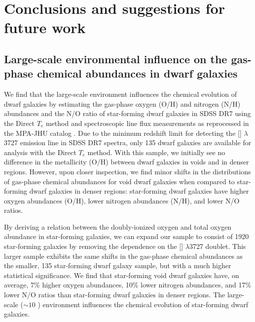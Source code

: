 \chapter[Conclusion]{Conclusions and suggestions for future work}

\section[Chemical abundances]{Large-scale environmental influence on the gas-phase chemical abundances in dwarf galaxies}
We find that the large-scale environment influences the chemical evolution of 
dwarf galaxies by estimating the gas-phase oxygen (O/H) and nitrogen (N/H) 
abundances and the N/O ratio of star-forming dwarf galaxies in SDSS DR7 using 
the Direct $T_e$ method and spectroscopic line flux measurements as reprocessed 
in the MPA-JHU catalog \citep[Douglass \& Vogeley 2017, in prep]{Douglass17a,
Douglass17b}.  Due to the minimum redshift limit for detecting the [] 
$\lambda$3727 emission line in SDSS DR7 spectra, only 135 dwarf galaxies are 
available for analysis with the Direct $T_e$ method.  With this sample, we 
initially see no difference in the metallicity (O/H) between dwarf galaxies in 
voids and in denser regions.  However, upon closer inspection, we find minor 
shifts in the distributions of gas-phase chemical abundances for void dwarf 
galaxies when compared to star-forming dwarf galaxies in denser regions: 
star-forming dwarf galaxies have higher oxygen abundances (O/H), lower nitrogen 
abundances (N/H), and lower N/O ratios.

By deriving a relation between the doubly-ionized oxygen and total oxygen 
abundance in star-forming galaxies, we can expand our sample to consist of 1920 
star-forming galaxies by removing the dependence on the [] 
$\lambda$3727 doublet.  This larger sample exhibits the same shifts in the 
gas-phase chemical abundances as the smaller, 135 star-forming dwarf galaxy 
sample, but with a much higher statistical significance.  We find that 
star-forming void dwarf galaxies have, on average, 7\% higher oxygen abundances, 
10\% lower nitrogen abundances, and 17\% lower N/O ratios than star-forming 
dwarf galaxies in denser regions.  The large-scale ($\sim 10$ \hMpc) environment 
influences the chemical evolution of star-forming dwarf galaxies.

